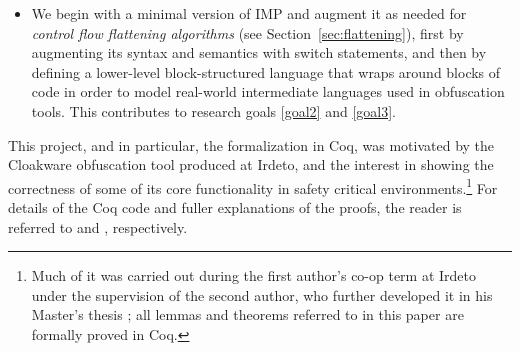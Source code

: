 \documentclass[compsoc,conference,a4paper,10pt,times]{IEEEtran}
\begin{document}
\begin{itemize}
   \item We begin with a minimal version of IMP and augment it as needed for \emph{control flow flattening algorithms} (see Section~\ref{sec:flattening}),
   first by augmenting its syntax and semantics with switch statements, and then by defining a lower-level block-structured language that wraps around blocks of code in order to model real-world intermediate languages used in obfuscation tools. This contributes to research goals \ref{goal2} and \ref{goal3}. \label{itm:3}
\end{itemize}

This project, and in particular, the formalization in Coq, was motivated by the Cloakware obfuscation tool produced at Irdeto, and the interest in showing the correctness of some of its core functionality in safety critical environments.\footnote{Much of it was carried out during the first author's co-op term at Irdeto under the supervision of the second author, who further developed it in his Master's thesis \cite{Weiyun}; all lemmas and theorems referred to in this paper are formally proved in Coq.} For details of the Coq code and fuller explanations of the proofs, the reader is referred to \cite{WeiRepo} and \cite{Weiyun}, respectively.


\end{document}
